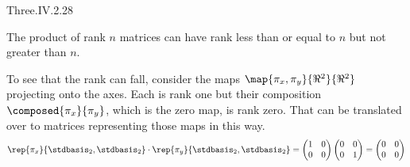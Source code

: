 \begin{ans}{Three.IV.2.28}
     \begin{exparts}
      \partsitem The product of rank \( n \) matrices can have rank less
        than or equal to \( n \) but not greater than \( n \).

        To see that the rank can fall,
        consider the maps \( \map{\pi_x,\pi_y}{\Re^2}{\Re^2} \) projecting onto
        the axes.
        Each is rank one but their composition
        $\composed{\pi_x}{\pi_y}$, which is the zero map, is rank zero.
        That can be translated over to matrices representing those
        maps in this way.
        \begin{equation*}
          \rep{\pi_x}{\stdbasis_2,\stdbasis_2}\cdot\rep{\pi_y}{\stdbasis_2,\stdbasis_2}=
          \begin{pmatrix}
            1  &0  \\
            0  &0
          \end{pmatrix}
          \begin{pmatrix}
            0  &0  \\
            0  &1
          \end{pmatrix}=
          \begin{pmatrix}
            0  &0  \\
            0  &0
          \end{pmatrix}
        \end{equation*}


\end{exparts}
\end{ans}
